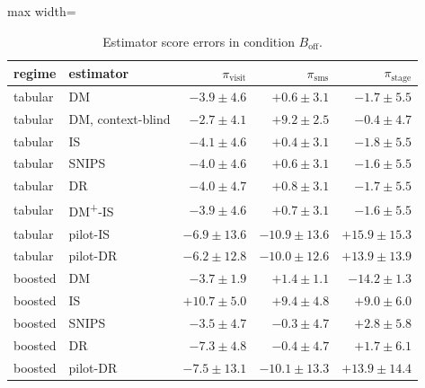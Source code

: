 \begin{table}[!htbp]
\centering
\caption{Estimator score errors in condition $B_{\mathrm{off}}$.}
\label{tab:campaignfullerrorsB_off}
\small
\begin{adjustbox}{max width=\linewidth}
\begin{tabular}{llrrr}
\toprule
regime & estimator & $\pi_{\mathrm{visit}}$ & $\pi_{\mathrm{sms}}$ & $\pi_{\mathrm{stage}}$ \\
\midrule
tabular & DM & $-3.9 \pm 4.6$ & $+0.6 \pm 3.1$ & $-1.7 \pm 5.5$ \\
tabular & DM, context-blind & $-2.7 \pm 4.1$ & $+9.2 \pm 2.5$ & $-0.4 \pm 4.7$ \\
tabular & IS & $-4.1 \pm 4.6$ & $+0.4 \pm 3.1$ & $-1.8 \pm 5.5$ \\
tabular & SNIPS & $-4.0 \pm 4.6$ & $+0.6 \pm 3.1$ & $-1.6 \pm 5.5$ \\
tabular & DR & $-4.0 \pm 4.7$ & $+0.8 \pm 3.1$ & $-1.7 \pm 5.5$ \\
tabular & DM\textsuperscript{+}-IS & $-3.9 \pm 4.6$ & $+0.7 \pm 3.1$ & $-1.6 \pm 5.5$ \\
tabular & pilot-IS & $-6.9 \pm 13.6$ & $-10.9 \pm 13.6$ & $+15.9 \pm 15.3$ \\
tabular & pilot-DR & $-6.2 \pm 12.8$ & $-10.0 \pm 12.6$ & $+13.9 \pm 13.9$ \\
boosted & DM & $-3.7 \pm 1.9$ & $+1.4 \pm 1.1$ & $-14.2 \pm 1.3$ \\
boosted & IS & $+10.7 \pm 5.0$ & $+9.4 \pm 4.8$ & $+9.0 \pm 6.0$ \\
boosted & SNIPS & $-3.5 \pm 4.7$ & $-0.3 \pm 4.7$ & $+2.8 \pm 5.8$ \\
boosted & DR & $-7.3 \pm 4.8$ & $-0.4 \pm 4.7$ & $+1.7 \pm 6.1$ \\
boosted & pilot-DR & $-7.5 \pm 13.1$ & $-10.1 \pm 13.3$ & $+13.9 \pm 14.4$ \\
\bottomrule
\end{tabular}
\end{adjustbox}
\end{table}
